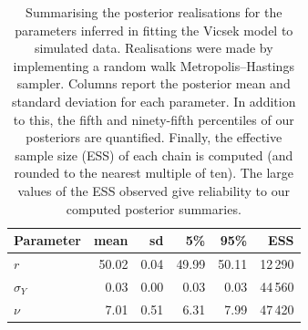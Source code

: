 \begin{table}[p]
  \begin{tabular}{@{}lrrrrr@{}}
    \toprule
    Parameter    & mean  & sd   & 5\%   & 95\%  & ESS     \\
    \midrule
    $r$          & 50.02 & 0.04 & 49.99 & 50.11 & 12\,290 \\
    $\sigma_{Y}$ & 0.03  & 0.00 & 0.03  & 0.03  & 44\,560 \\
    $\nu$        & 7.01  & 0.51 & 6.31  & 7.99  & 47\,420 \\
    \bottomrule
  \end{tabular}
  \caption{Summarising the posterior realisations for the parameters inferred
    in fitting the Vicsek model to simulated data. Realisations were made by
    implementing a random walk Metropolis--Hastings sampler. Columns report
    the posterior mean and standard deviation for each parameter. In addition
    to this, the fifth and ninety-fifth percentiles of our posteriors are
    quantified. Finally, the effective sample size (ESS) of each chain is
    computed (and rounded to the nearest multiple of ten). The large values
    of the ESS observed give reliability to our computed posterior summaries.}
  \label{tab:vicsek_summary}
\end{table}%
